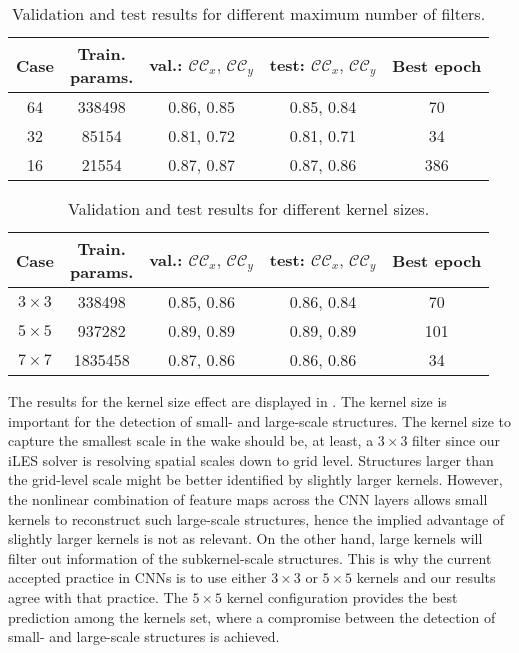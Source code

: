 \documentclass[../main.tex]{subfiles}
\begin{document}
{\renewcommand{\arraystretch}{1.2}
\begin{table}
\begin{center}
\begin{tabular}{ccccc}
\toprule
Case & \specialcell{Train.\\params.} & val.: $\mathcal{CC}_x,\,\mathcal{CC}_y$ & test: $\mathcal{CC}_x,\,\mathcal{CC}_y$ & Best epoch\\
\midrule
64 & 338498 & 0.86, 0.85 & 0.85, 0.84  & 70\\
32 & 85154 & 0.81, 0.72 & 0.81, 0.71 & 34\\
16 & 21554 & 0.87, 0.87 & 0.87, 0.86 & 386\\
\bottomrule
\end{tabular}
\end{center}
\caption{Validation and test results for different maximum number of filters.}
\label{tab:filters_correlation}
\end{table}}

{\renewcommand{\arraystretch}{1.2}
\begin{table}
\begin{center}
\begin{tabular}{ccccc}
\toprule
Case & \specialcell{Train.\\params.} & val.: $\mathcal{CC}_x,\,\mathcal{CC}_y$ & test: $\mathcal{CC}_x,\,\mathcal{CC}_y$ & Best epoch\\
\midrule
$3\times3$ & 338498 & 0.85, 0.86 & 0.86, 0.84 & 70 \\
$5\times5$ & 937282 & 0.89, 0.89 & 0.89, 0.89 & 101\\
$7\times7$ & 1835458 & 0.87, 0.86 & 0.86, 0.86 & 34\\
\bottomrule
\end{tabular}
\end{center}
\caption{Validation and test results for different kernel sizes.}
\label{tab:kernels_correlation}
\end{table}}

The results for the kernel size effect are displayed in .
The kernel size is important for the detection of small- and large-scale structures.
The kernel size to capture the smallest scale in the wake should be, at least, a $3\times3$ filter since our iLES solver is resolving spatial scales down to grid level.
Structures larger than the grid-level scale might be better identified by slightly larger kernels.
However, the nonlinear combination of feature maps across the CNN layers allows small kernels to reconstruct such large-scale structures, hence the implied advantage of slightly larger kernels is not as relevant.
On the other hand, large kernels will filter out information of the subkernel-scale structures.
This is why the current accepted practice in CNNs is to use either $3\times3$ or $5\times5$ kernels and our results agree with that practice.
The $5\times5$ kernel configuration provides the best prediction among the kernels set, where a compromise between the detection of small- and large-scale structures is achieved.
\end{document}
